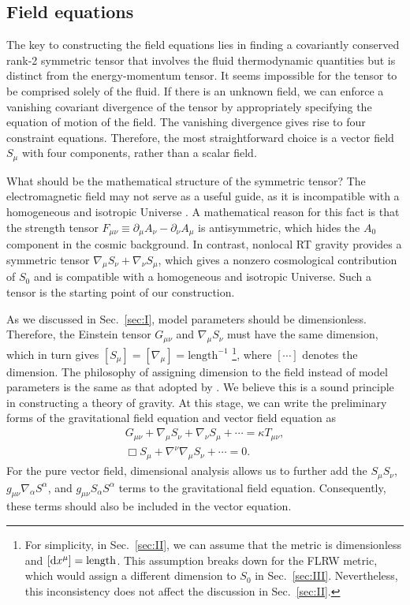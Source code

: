 \documentclass[aps,prd,twocolumn]{revtex4-2}
\newcommand\dx{{\rm d}}
\newcommand\p{\partial}
\begin{document}
\subsection{Field equations}\label{sec:II.A}
The key to constructing the field equations lies in finding a covariantly conserved rank-2 symmetric tensor that involves the fluid thermodynamic quantities but is distinct from the energy-momentum tensor. It seems impossible for the tensor to be comprised solely of the fluid. If there is an unknown field, we can enforce a vanishing covariant divergence of the tensor by appropriately specifying the equation of motion of the field. The vanishing divergence gives rise to four constraint equations. Therefore, the most straightforward choice is a vector field $S_\mu$ with four components, rather than a scalar field.

What should be the mathematical structure of the symmetric tensor? The electromagnetic field may not serve as a useful guide, as it is incompatible with a homogeneous and isotropic Universe \cite{Jacobs1968.ApJ.153.661,Heisenberg2019.PhysRep.796.1}. A mathematical reason for this fact is that the strength tensor $F_{\mu\nu}\equiv\p_\mu A_\nu-\p_\nu A_\mu$ is antisymmetric, which hides the $A_0$ component in the cosmic background. In contrast, nonlocal RT gravity \cite{Maggiore2014.PRD.89.043008,Dirian2014.JCAP.06.033,Tian2019.PRD.100.124059} provides a symmetric tensor $\nabla_\mu S_\nu+\nabla_\nu S_\mu$, which gives a nonzero cosmological contribution of $S_0$ and is compatible with a homogeneous and isotropic Universe. Such a tensor is the starting point of our construction.

As we discussed in Sec.~\ref{sec:I}, model parameters should be dimensionless. Therefore, the Einstein tensor $G_{\mu\nu}$ and $\nabla_\mu S_\nu$ must have the same dimension, which in turn gives $[S_\mu]=[\nabla_\mu]=\mathrm{length}^{-1}$ \footnote{For simplicity, in Sec.~\ref{sec:II}, we can assume that the metric is dimensionless and $[\dx x^\mu]=\mathrm{length}$. This assumption breaks down for the FLRW metric, which would assign a different dimension to $S_0$ in Sec.~\ref{sec:III}. Nevertheless, this inconsistency does not affect the discussion in Sec.~\ref{sec:II}.}, where $[\cdots]$ denotes the dimension. The philosophy of assigning dimension to the field instead of model parameters is the same as that adopted by \citet{Brans1961.PhysRev.124.925}. We believe this is a sound principle in constructing a theory of gravity. At this stage, we can write the preliminary forms of the gravitational field equation and vector field equation as
\begin{gather}
  G_{\mu\nu} + \nabla_\mu S_\nu + \nabla_\nu S_\mu + \cdots = \kappa T_{\mu\nu}, \nonumber\\
  \Box S_\mu + \nabla^\nu\nabla_\mu S_\nu + \cdots = 0. \nonumber
\end{gather}
For the pure vector field, dimensional analysis allows us to further add the $S_\mu S_\nu$, $g_{\mu\nu}\nabla_\alpha S^\alpha$, and $g_{\mu\nu}S_\alpha S^\alpha$ terms to the gravitational field equation. Consequently, these terms should also be included in the vector equation.
\end{document}
